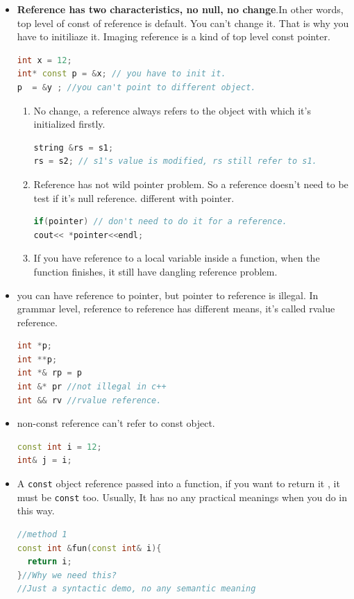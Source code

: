 \documentclass[a4paper,12pt,twoside]{book}
\begin{document}
\begin{itemize}
\item \textbf{Reference has two characteristics, no null, no change}.In other words, top level of const of reference is default. You can't change it. That is why you have to initiliaze it. Imaging reference is a kind of top level const pointer.
\begin{lstlisting}[frame=single, language=c++]
int x = 12;
int* const p = &x; // you have to init it.
p  = &y ; //you can't point to different object.
\end{lstlisting}

\begin{enumerate}
\item No change, a reference always refers to the object with which it's initialized firstly.
\begin{lstlisting}[frame=single, language=c++]
string &rs = s1;
rs = s2; // s1's value is modified, rs still refer to s1.
\end{lstlisting}

\item Reference has not wild pointer problem. So a reference doesn't need to be test if it's null reference. different with pointer. 
\begin{lstlisting}[frame=single, language=c++]
if(pointer) // don't need to do it for a reference.
cout<< *pointer<<endl;
\end{lstlisting}

\item If you have reference to a local variable inside a function, when the function finishes, it still have dangling reference problem. 
\end{enumerate}

\item you can have reference to pointer, but pointer to reference is illegal. In grammar level, reference to reference has different means, it's called rvalue reference. 
\begin{lstlisting}[frame=single, language=c++]
int *p;
int **p;
int *& rp = p
int &* pr //not illegal in c++
int && rv //rvalue reference.
\end{lstlisting}

\item non-const reference can't refer to const object.
\begin{lstlisting}[frame=single, language=c++]
const int i = 12;
int& j = i;
\end{lstlisting}

\item A \texttt{const} object reference passed into a function, if you want to return it , it must be \texttt{const} too. Usually, It has no any practical meanings when you do in this way. 
\begin{lstlisting}[frame=single, language=c++]
//method 1
const int &fun(const int& i){
  return i;
}//Why we need this?
//Just a syntactic demo, no any semantic meaning


\end{lstlisting}
\end{itemize}
\end{document}
